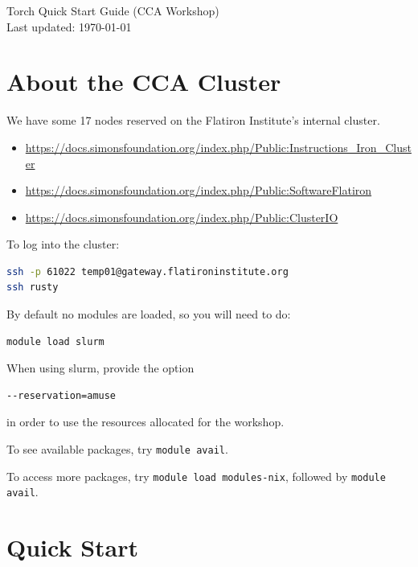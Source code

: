 \documentclass[10pt]{article}
\begin{document}
\begin{center}
Torch Quick Start Guide (CCA Workshop) \\
Last updated: \today \\
\end{center}

\tableofcontents
\newpage


\section{About the CCA Cluster}

We have some 17 nodes reserved on the Flatiron Institute's internal cluster.
\begin{itemize}
\item \url{https://docs.simonsfoundation.org/index.php/Public:Instructions_Iron_Cluster}
\item \url{https://docs.simonsfoundation.org/index.php/Public:SoftwareFlatiron}
\item \url{https://docs.simonsfoundation.org/index.php/Public:ClusterIO}
\end{itemize}

To log into the cluster:
\begin{lstlisting}[language=bash]
ssh -p 61022 temp01@gateway.flatironinstitute.org
ssh rusty
\end{lstlisting}

By default no modules are loaded, so you will need to do:
\begin{lstlisting}[language=bash]
module load slurm
\end{lstlisting}

When using slurm, provide the option
\begin{lstlisting}[language=bash]
--reservation=amuse
\end{lstlisting}
in order to use the resources allocated for the workshop.

To see available packages, try \texttt{module avail}.

To access more packages, try \texttt{module load modules-nix}, followed by
\texttt{module avail}.

\section{Quick Start}

\end{document}
